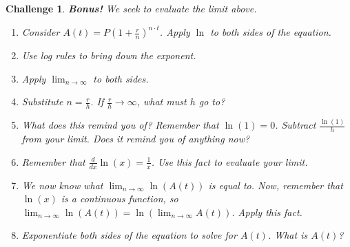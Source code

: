 \documentclass[12pt]{article}
\theoremstyle{mainstyle} %
\theoremstyle{longstyle}
\newtheorem{ex}[thm]{Challenge}
\begin{document}
\begin{ex}
  \textbf{Bonus!} We seek to evaluate the limit above.
  \begin{enumerate}
  \item Consider \(A(t) = P \left( 1 + \frac{r}{n}
    \right)^{n \cdot t}\). Apply \(\ln\) to both sides of the
    equation.
    \vspace{1in}
  \item Use log rules to bring down the exponent.
    \vspace{1in}
  \item Apply \(\lim_{n \to \infty}\) to both sides.
    \vspace{1in}
  \item Substitute \(n = \frac{r}{h}\). If \(\frac{r}{h} \to \infty\),
    what must \(h\) go to?
    \vspace{1in}
  \item What does this remind you of? Remember that \(\ln(1) =
    0\). Subtract \(\frac{\ln(1)}{h}\) from your limit. Does it remind
    you of anything now?
    \vspace{1in}
  \item Remember that \(\frac{d}{dx} \ln(x) = \frac{1}{x}\). Use this
    fact to evaluate your limit.
        \vspace{1in}
  \item We now know what \(\lim_{n \to \infty} \ln(A(t))\) is equal
    to. Now, remember that \(\ln(x)\) is a continuous function, so
    \(\lim_{n \to \infty} \ln(A(t)) = \ln(\lim_{n\to\infty}
    A(t))\). Apply this fact.
        \vspace{1in}
  \item Exponentiate both sides of the equation to solve for \(A(t)\). What is \(A(t)\)?
  \end{enumerate}

\end{ex}
\end{document}
